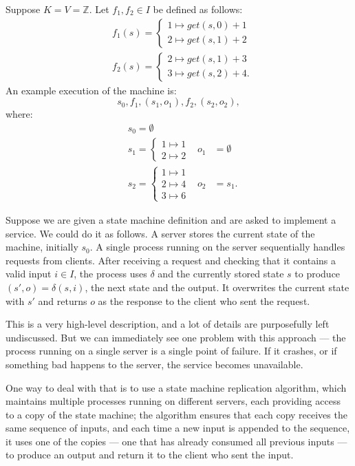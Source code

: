 \documentclass[12pt,a4paper,en]{pracamgr}
\newcommand{\mbb}[1]{\mathbb{#1}}
\begin{document}
\begin{ex}
	Suppose $K = V = \mbb Z$. Let $f_1, f_2 \in I$ be defined as follows:
    \begin{align*}
        & f_1(s) = \begin{cases} 1 \mapsto get(s, 0) + 1\\ 2 \mapsto get(s, 1) + 2 \end{cases}\\
        & f_2(s) = \begin{cases} 2 \mapsto get(s, 1) + 3\\ 3 \mapsto get(s, 2) + 4. \end{cases}
    \end{align*}
    An example execution of the machine is:
    $$ s_0, f_1, (s_1, o_1), f_2, (s_2, o_2), $$
    where:
    \begin{align*}
        & s_0 = \emptyset\\
        & s_1 = \begin{cases} 1 \mapsto 1 \\ 2 \mapsto 2 \end{cases}
            & o_1 &= \emptyset\\
        & s_2 = \begin{cases} 1 \mapsto 1 \\ 2 \mapsto 4 \\ 3 \mapsto 6 \end{cases}
            & o_2 &= s_1.
    \end{align*}

\end{ex}

Suppose we are given a state machine definition and are asked to implement a service. We could do it as follows. A server stores the current state of the machine, initially $s_0$. A single process running on the server sequentially handles requests from clients. After receiving a request and checking that it contains a valid input $i \in I$, the process uses $\delta$ and the currently stored state $s$ to produce $(s', o) = \delta(s, i)$, the next state and the output. It overwrites the current state with $s'$ and returns $o$ as the response to the client who sent the request.

This is a very high-level description, and a lot of details are purposefully left undiscussed. But we can immediately see one problem with this approach --- the process running on a single server is a single point of failure. If it crashes, or if something bad happens to the server, the service becomes unavailable.

One way to deal with that is to use a state machine replication algorithm, which maintains multiple processes running on different servers, each providing access to a copy of the state machine; the algorithm ensures that each copy receives the same sequence of inputs, and each time a new input is appended to the sequence, it uses one of the copies --- one that has already consumed all previous inputs --- to produce an output and return it to the client who sent the input.
\end{document}
